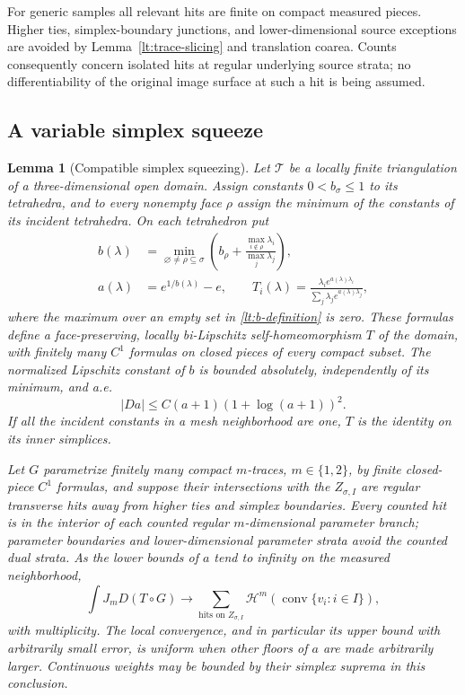 \documentclass[11pt]{article}
\numberwithin{equation}{section}
\newtheorem{lemma}[theorem]{Lemma}
\theoremstyle{definition}
\theoremstyle{remark}
\newcommand{\cH}{\mathcal H}
\DeclareMathOperator{\conv}{conv}
\begin{document}
For generic samples all relevant hits are finite on compact measured
pieces.  Higher ties, simplex-boundary junctions, and lower-dimensional
source exceptions are avoided by Lemma~\ref{lt:trace-slicing} and
translation coarea.  Counts consequently concern isolated hits at
regular underlying source strata; no differentiability of the original
image surface at such a hit is being assumed.

\subsection{A variable simplex squeeze}

\begin{lemma}[Compatible simplex squeezing]
\label{lt:squeeze}
Let $\mathcal T$ be a locally finite triangulation of a three-dimensional
open domain.  Assign constants $0<b_\sigma\leq1$ to its tetrahedra,
and to every nonempty face $\rho$ assign the minimum of the constants
of its incident tetrahedra.  On each tetrahedron put
\begin{align}
 b(\lambda)&=
 \min_{\varnothing\ne\rho\subseteq\sigma}
 \left(b_\rho+
        \frac{\max_{i\notin\rho}\lambda_i}{\max_j\lambda_j}\right),
       \label{lt:b-definition}\\
 a(\lambda)&=e^{1/b(\lambda)}-e,
 \qquad
 T_i(\lambda)=
 \frac{\lambda_i e^{a(\lambda)\lambda_i}}
             {\sum_j\lambda_j e^{a(\lambda)\lambda_j}},
       \label{lt:squeeze-definition}
\end{align}
where the maximum over an empty set in \eqref{lt:b-definition} is zero.
These formulas define a face-preserving, locally bi-Lipschitz
self-homeomorphism $T$ of the domain, with finitely many $C^1$ formulas
on closed pieces of every compact subset.  The normalized Lipschitz
constant of $b$ is bounded absolutely, independently of its minimum,
and a.e.
\begin{equation}
 |Da|\leq C(a+1)(1+\log(a+1))^2.
 \label{lt:a-derivative}
\end{equation}
If all the incident constants in a mesh neighborhood are one, $T$ is
the identity on its inner simplices.

Let $G$ parametrize finitely many compact $m$-traces, $m\in\{1,2\}$,
by finite closed-piece $C^1$ formulas, and suppose their intersections
with the $Z_{\sigma,I}$ are regular transverse hits away from higher
ties and simplex boundaries.  Every counted hit is in the interior
of each counted regular $m$-dimensional parameter branch; parameter
boundaries and lower-dimensional parameter strata avoid the counted
dual strata.  As the lower bounds of $a$ tend to
infinity on the measured neighborhood,
\begin{equation}
 \int J_mD(T\circ G)
 \longrightarrow
 \sum_{\text{hits on }Z_{\sigma,I}}
       \cH^m(\conv\{v_i:i\in I\}),
 \label{lt:squeeze-area}
\end{equation}
with multiplicity.  The local convergence, and in particular its upper
bound with arbitrarily small error, is uniform when other floors of
$a$ are made arbitrarily larger.  Continuous weights may be bounded
by their simplex suprema in this conclusion.
\end{lemma}
\end{document}
